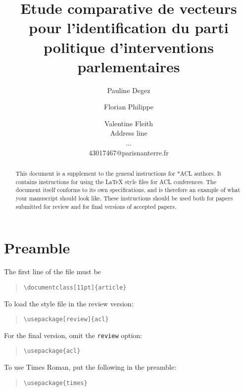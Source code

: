 \documentclass[11pt]{article}
\title{Etude comparative de vecteurs pour l'identification du parti politique d'interventions parlementaires}
\author{Pauline Degez \and Florian Philippe \and Valentine Fleith \\
         Address line \\ ... \\ 43017467@parisnanterre.fr}
\begin{document}
\maketitle
\begin{abstract}
This document is a supplement to the general instructions for *ACL authors. It contains instructions for using the \LaTeX{} style files for ACL conferences.
The document itself conforms to its own specifications, and is therefore an example of what your manuscript should look like.
These instructions should be used both for papers submitted for review and for final versions of accepted papers.
\end{abstract}









\section{Preamble}

The first line of the file must be
\begin{quote}
\begin{verbatim}
\documentclass[11pt]{article}
\end{verbatim}
\end{quote}

To load the style file in the review version:
\begin{quote}
\begin{verbatim}
\usepackage[review]{acl}
\end{verbatim}
\end{quote}
For the final version, omit the \verb|review| option:
\begin{quote}
\begin{verbatim}
\usepackage{acl}
\end{verbatim}
\end{quote}

To use Times Roman, put the following in the preamble:
\begin{quote}
\begin{verbatim}
\usepackage{times}
\end{verbatim}
\end{quote}
\end{document}
